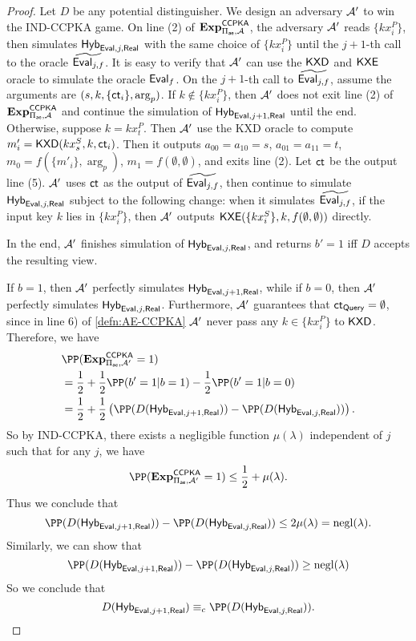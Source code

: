 \begin{proof}
    Let $D$ be any potential distinguisher. We design an adversary $\mathcal{A}'$ to win the IND-CCPKA game. On line (2) of $\mathbf{Exp}^{\mathsf{CCPKA}}_{\Pi_{\mathsf{ae}}, \mathcal{A}}$, the adversary $\mathcal{A}'$ reads $\{kx_i^P\}$, then simulates $\mathsf{Hyb}_{\mathsf{Eval}, j, \mathsf{Real}}$ with the same choice of $\{kx_i^P\}$ until the $j + 1$-th call to the oracle $\widetilde{\mathsf{Eval}_{j, f}}$. It is easy to verify that $\mathcal{A}'$ can use the $\mathsf{KXD}$ and $\mathsf{KXE}$ oracle to simulate the oracle $\mathsf{Eval}_f$. On the $j + 1$-th call to $\widetilde{\mathsf{Eval}_{j, f}}$, assume the arguments are $(s, k, \{\mathsf{ct}_i\}, \arg_p)$. If $k\notin \{kx_i^P\}$, then $\mathcal{A}'$ does not exit line (2) of $\mathbf{Exp}^{\mathsf{CCPKA}}_{\Pi_{\mathsf{ae}}, \mathcal{A}}$ and continue the simulation of $\mathsf{Hyb}_{\mathsf{Eval}, j + 1, \mathsf{Real}}$ until the end. Otherwise, suppose $k = kx_{t}^P$. Then $\mathcal{A}'$ use the KXD oracle to compute $m'_i = \mathsf{KXD}(kx_s^S, k, \mathsf{ct}_i)$. Then it outputs $a_{00} = a_{10} = s$, $a_{01} = a_{11} = t$, $m_0 = f(\{m'_i\}, \arg_p)$, $m_1 = f(\emptyset, \emptyset)$, and exits line (2). Let $\mathsf{ct}$ be the output line (5). $\mathcal{A}'$ uses $\mathsf{ct}$ as the output of $\widetilde{\mathsf{Eval}_{j, f}}$, then continue to simulate $\mathsf{Hyb}_{\mathsf{Eval}, j, \mathsf{Real}}$ subject to the following change: when it simulates $\widetilde{\mathsf{Eval}_{j, f}}$, if the input key $k$ lies in $\{kx_i^P\}$, then $\mathcal{A}'$ outputs $\mathsf{KXE}(\{kx_i^S\}, k, f(\emptyset, \emptyset))$ directly.

    In the end, $\mathcal{A}'$ finishes simulation of $\mathsf{Hyb}_{\mathsf{Eval}, j, \mathsf{Real}}$, and returns $b' = 1$ iff $D$ accepts the resulting view.

    If $b = 1$, then $\mathcal{A}'$ perfectly simulates $\mathsf{Hyb}_{\mathsf{Eval}, j + 1, \mathsf{Real}}$, while if $b = 0$, then $\mathcal{A}'$ perfectly simulates $\mathsf{Hyb}_{\mathsf{Eval}, j, \mathsf{Real}}$. Furthermore, $\mathcal{A}'$ guarantees that $\mathsf{ct}_{\mathsf{Query}} = \emptyset$, since in line 6) of \cref{defn:AE-CCPKA} $\mathcal{A}'$ never pass any $k \in \{kx_i^P\}$ to $\mathsf{KXD}$. Therefore, we have
    \begin{align*}
     &\PP(\mathbf{Exp}^{\mathsf{CCPKA}}_{\Pi_{\ae}, \cA'} = 1) \\
     &= \frac{1}{2} + \frac{1}{2}\PP(b' = 1 | b = 1) - \frac{1}{2}\PP(b' = 1 | b = 0) \\   
     &= \frac{1}{2} + \frac{1}{2}\left(\PP(D(\Hyb_{\Eval, j + 1, \Real})) - \PP(D(\Hyb_{\Eval, j, \Real}))\right).
    \end{align*}
    So by IND-CCPKA, there exists a negligible function $\mu(\lambda)$ independent of $j$ such that for any $j$, we have
    $$\PP(\mathbf{Exp}^{\mathsf{CCPKA}}_{\Pi_{\ae}, \cA'} = 1) \leq \frac{1}{2} + \mu(\lambda).$$
    Thus we conclude that
    $$\PP(D(\Hyb_{\Eval, j + 1, \Real})) - \PP(D(\Hyb_{\Eval, j, \Real})) \leq 2\mu(\lambda) = \negl(\lambda).$$
    Similarly, we can show that
    $$\PP(D(\Hyb_{\Eval, j + 1, \Real})) - \PP(D(\Hyb_{\Eval, j, \Real})) \geq \negl(\lambda)$$
    So we conclude that
    $$D(\Hyb_{\Eval, j + 1, \Real}) \equiv_c \PP(D(\Hyb_{\Eval, j, \Real})).$$
\end{proof}
